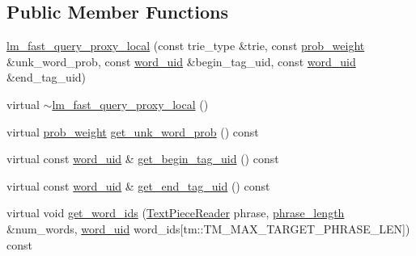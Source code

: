 \subsection*{Public Member Functions}
\begin{DoxyCompactItemize}
\item 
\hyperlink{classuva_1_1smt_1_1bpbd_1_1server_1_1lm_1_1proxy_1_1lm__fast__query__proxy__local_a9fb1bfa3326d7084829eaf05d9138976}{lm\+\_\+fast\+\_\+query\+\_\+proxy\+\_\+local} (const trie\+\_\+type \&trie, const \hyperlink{namespaceuva_1_1smt_1_1bpbd_1_1server_a01e9ea4de9c226f4464862e84ff0bbcc}{prob\+\_\+weight} \&unk\+\_\+word\+\_\+prob, const \hyperlink{namespaceuva_1_1smt_1_1bpbd_1_1server_a6bfe45ba344d65a7fdd7d26156328ddc}{word\+\_\+uid} \&begin\+\_\+tag\+\_\+uid, const \hyperlink{namespaceuva_1_1smt_1_1bpbd_1_1server_a6bfe45ba344d65a7fdd7d26156328ddc}{word\+\_\+uid} \&end\+\_\+tag\+\_\+uid)
\item 
virtual \hyperlink{classuva_1_1smt_1_1bpbd_1_1server_1_1lm_1_1proxy_1_1lm__fast__query__proxy__local_a61cabd0355db1922b81c0ad13f2ae4b0}{$\sim$lm\+\_\+fast\+\_\+query\+\_\+proxy\+\_\+local} ()
\item 
virtual \hyperlink{namespaceuva_1_1smt_1_1bpbd_1_1server_a01e9ea4de9c226f4464862e84ff0bbcc}{prob\+\_\+weight} \hyperlink{classuva_1_1smt_1_1bpbd_1_1server_1_1lm_1_1proxy_1_1lm__fast__query__proxy__local_a8ea28c0c78a2e6e13d90e83191c399bb}{get\+\_\+unk\+\_\+word\+\_\+prob} () const 
\item 
virtual const \hyperlink{namespaceuva_1_1smt_1_1bpbd_1_1server_a6bfe45ba344d65a7fdd7d26156328ddc}{word\+\_\+uid} \& \hyperlink{classuva_1_1smt_1_1bpbd_1_1server_1_1lm_1_1proxy_1_1lm__fast__query__proxy__local_a5210236c6ea75466dc52df82f595630b}{get\+\_\+begin\+\_\+tag\+\_\+uid} () const 
\item 
virtual const \hyperlink{namespaceuva_1_1smt_1_1bpbd_1_1server_a6bfe45ba344d65a7fdd7d26156328ddc}{word\+\_\+uid} \& \hyperlink{classuva_1_1smt_1_1bpbd_1_1server_1_1lm_1_1proxy_1_1lm__fast__query__proxy__local_a324b9d32f9ffb5c1a134a66e06e14002}{get\+\_\+end\+\_\+tag\+\_\+uid} () const 
\item 
virtual void \hyperlink{classuva_1_1smt_1_1bpbd_1_1server_1_1lm_1_1proxy_1_1lm__fast__query__proxy__local_a3fe646d39b9b15ef6fd3f6db92f124ee}{get\+\_\+word\+\_\+ids} (\hyperlink{classuva_1_1utils_1_1file_1_1_text_piece_reader}{Text\+Piece\+Reader} phrase, \hyperlink{namespaceuva_1_1smt_1_1bpbd_1_1server_af068a19c2e03116caf3e3827a3e40e35}{phrase\+\_\+length} \&num\+\_\+words, \hyperlink{namespaceuva_1_1smt_1_1bpbd_1_1server_a6bfe45ba344d65a7fdd7d26156328ddc}{word\+\_\+uid} word\+\_\+ids\mbox{[}tm\+::\+T\+M\+\_\+\+M\+A\+X\+\_\+\+T\+A\+R\+G\+E\+T\+\_\+\+P\+H\+R\+A\+S\+E\+\_\+\+L\+E\+N\mbox{]}) const 

\end{DoxyCompactItemize}
